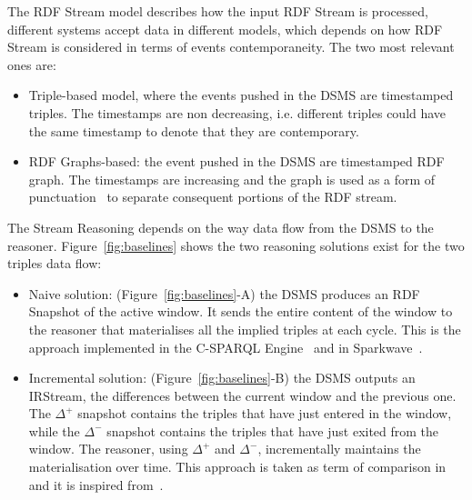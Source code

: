 The RDF Stream model describes how the input RDF Stream is processed, different systems accept data in different models, which depends on how RDF Stream is considered in terms of events contemporaneity. The two most relevant ones are:

\begin{itemize}	
\item Triple-based model, where the events pushed in the DSMS are timestamped triples. The timestamps are non decreasing, i.e. different triples could have the same timestamp to denote that they are contemporary.
\item RDF Graphs-based: the event pushed in the DSMS are timestamped RDF graph. The timestamps are increasing and the graph is used as a form of punctuation~\cite{Tatbul2003b} to separate consequent portions of the RDF stream.
\end{itemize}

The Stream Reasoning depends on the way data flow from the DSMS to the reasoner. Figure~\ref{fig:baselines} shows the two reasoning solutions exist for the two triples data flow:

\begin{itemize}
\item Naive solution: (Figure~\ref{fig:baselines}-A) the DSMS produces an RDF Snapshot of the active window. It sends the entire content of the window to the reasoner that materialises all the implied triples at each cycle. This is the approach implemented in the C-SPARQL Engine~\cite{DBLP:journals/sigmod/BarbieriBCVG10} and in Sparkwave~\cite{DBLP:conf/debs/KomazecCF12}.
\item Incremental solution: (Figure~\ref{fig:baselines}-B) the DSMS outputs an IRStream, the differences between the current window and the previous one. The $\Delta^{+}$ snapshot contains the triples that have just entered in the window, while the $\Delta^{-}$ snapshot contains the triples that have just exited from the window. The reasoner, using $\Delta^{+}$ and $\Delta^{-}$, incrementally maintains the materialisation over time. This approach is taken as term of comparison in~\cite{DellAglio2014} and it is inspired from~\cite{DBLP:conf/cikm/RenP11}.
\end{itemize}

